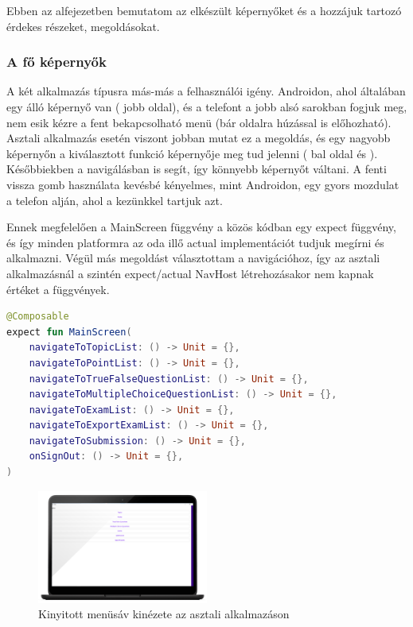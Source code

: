 Ebben az alfejezetben bemutatom az elkészült képernyőket és a hozzájuk tartozó érdekes részeket, megoldásokat.

\subsubsection{A fő képernyők}

A két alkalmazás típusra más-más a felhasználói igény.
Androidon, ahol általában egy álló képernyő van ( jobb oldal), és a telefont a jobb alsó sarokban fogjuk meg, nem esik kézre a fent bekapcsolható menü (bár oldalra húzással is előhozható). 
Asztali alkalmazás esetén viszont jobban mutat ez a megoldás, és egy nagyobb képernyőn a kiválasztott funkció képernyője meg tud jelenni ( bal oldal és ).
Későbbiekben a navigálásban is segít, így könnyebb képernyőt váltani. A fenti vissza gomb használata kevésbé kényelmes, mint Androidon, egy gyors mozdulat a telefon alján, ahol a kezünkkel tartjuk azt.

Ennek megfelelően a MainScreen függvény a közös kódban egy expect függvény, és így minden platformra az oda illő actual implementációt tudjuk megírni és alkalmazni.
Végül más megoldást választottam a navigációhoz, így az asztali alkalmazásnál a szintén expect/actual NavHost létrehozásakor nem kapnak értéket a függvények.
\begin{lstlisting}[caption={Expect Főképernyő.}, label={lst:ExpectMainScreen}, language=Kotlin]
@Composable
expect fun MainScreen(
    navigateToTopicList: () -> Unit = {},
    navigateToPointList: () -> Unit = {},
    navigateToTrueFalseQuestionList: () -> Unit = {},
    navigateToMultipleChoiceQuestionList: () -> Unit = {},
    navigateToExamList: () -> Unit = {},
    navigateToExportExamList: () -> Unit = {},
    navigateToSubmission: () -> Unit = {},
    onSignOut: () -> Unit = {},
)
\end{lstlisting}
\begin{figure}[!ht]
    \centering
    \includegraphics[width=0.5\textwidth, keepaspectratio]{figures/MainScreen_Desktop2_framed.png}
    \caption{Kinyitott menüsáv kinézete az asztali alkalmazáson}
    \label{fig:OpenMenu}
\end{figure}

